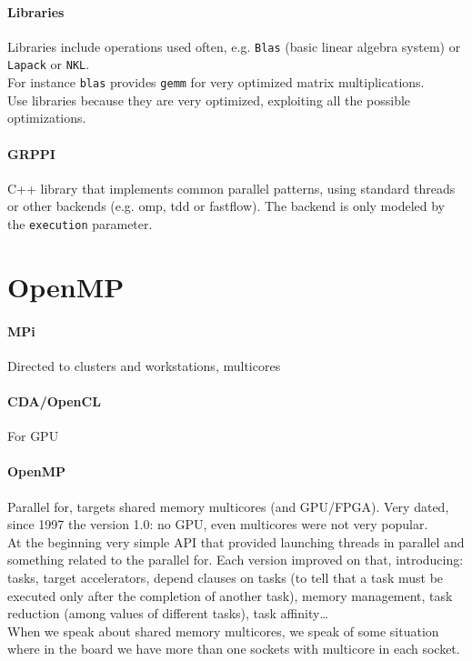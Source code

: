 \documentclass[10pt]{report}
\begin{document}
\paragraph{Libraries} Libraries include operations used often, e.g. \texttt{Blas} (basic linear algebra system) or \texttt{Lapack} or \texttt{NKL}.\\
For instance \texttt{blas} provides \texttt{gemm} for very optimized matrix multiplications.\\
Use libraries because they are very optimized, exploiting all the possible optimizations.
\paragraph{GRPPI} C++ library that implements common parallel patterns, using standard threads or other backends (e.g. omp, tdd or fastflow). The backend is only modeled by the \texttt{execution} parameter.
\section{OpenMP}
\paragraph{MPi} Directed to clusters and workstations, multicores
\paragraph{CDA/OpenCL} For GPU
\paragraph{OpenMP} Parallel for, targets shared memory multicores (and GPU/FPGA). Very dated, since 1997 the version 1.0: no GPU, even multicores were not very popular.\\
At the beginning very simple API that provided launching threads in parallel and something related to the parallel for. Each version improved on that, introducing: tasks, target accelerators, depend clauses on tasks (to tell that a task must be executed only after the completion of another task), memory management, task reduction (among values of different tasks), task affinity\ldots\\
When we speak about shared memory multicores, we speak of some situation where in the board we have more than one sockets with multicore in each socket.
\end{document}
